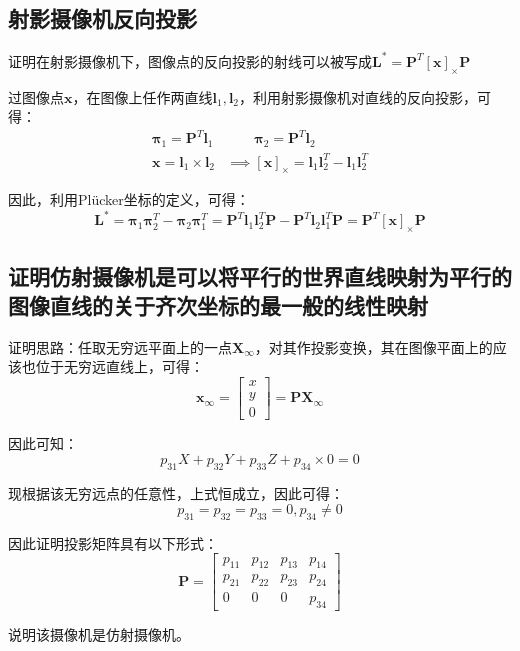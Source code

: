 \documentclass[11pt]{article}
\begin{document}
\subsection{射影摄像机反向投影}
{\heiti 证明在射影摄像机下，图像点的反向投影的射线可以被写成$\mathbf{L}^*=\mathbf{P}^T\mathbf{[x]_\times P}$}\par
过图像点$\mathbf{x}$，在图像上任作两直线$\mathbf{l}_1,\mathbf{l}_2$，利用射影摄像机对直线的反向投影，可得：
\begin{align*}
  \mathbold{\pi}_1=\mathbf{P}^T\mathbf{l}_1 & \qquad\mathbold{\pi}_2=\mathbf{P}^T\mathbf{l}_2                                   \\
  \mathbf{x}=\mathbf{l}_1\times\mathbf{l}_2 & \implies\mathbf{[x]_\times}=\mathbf{l}_1\mathbf{l}_2^T-\mathbf{l}_1\mathbf{l}_2^T
\end{align*}\par
因此，利用Plücker坐标的定义，可得：
\begin{equation*}
  \mathbf{L}^*=\mathbold{\pi}_1\mathbold{\pi}_2^T-\mathbold{\pi}_2\mathbold{\pi}_1^T=\mathbf{P}^T\mathbf{l}_1\mathbf{l}_2^T\mathbf{P}-\mathbf{P}^T\mathbf{l}_2\mathbf{l}_1^T\mathbf{P}=\mathbf{P}^T\mathbf{[x]_\times P}
\end{equation*}\par
\subsection{证明仿射摄像机是可以将平行的世界直线映射为平行的图像直线的关于齐次坐标的最一般的线性映射}
证明思路：任取无穷远平面上的一点$\mathbf{X}_\infty$，对其作投影变换，其在图像平面上的应该也位于无穷远直线上，可得：
\begin{equation*}
  \mathbf{x}_\infty=\begin{bmatrix}
    x \\y\\0
  \end{bmatrix}=\mathbf{P}\mathbf{X}_\infty
\end{equation*}\par
因此可知：
\begin{equation*}
  p_{31}X+p_{32}Y+p_{33}Z+p_{34}\times0=0
\end{equation*}\par
现根据该无穷远点的任意性，上式恒成立，因此可得：
\begin{equation*}
  p_{31}=p_{32}=p_{33}=0,p_{34}\neq0
\end{equation*}\par
因此证明投影矩阵具有以下形式：
\begin{equation*}
  \mathbf{P}=\begin{bmatrix}
    p_{11} & p_{12} & p_{13} & p_{14} \\
    p_{21} & p_{22} & p_{23} & p_{24} \\
    0      & 0      & 0      & p_{34}
  \end{bmatrix}
\end{equation*}\par
说明该摄像机是仿射摄像机。
\end{document}
